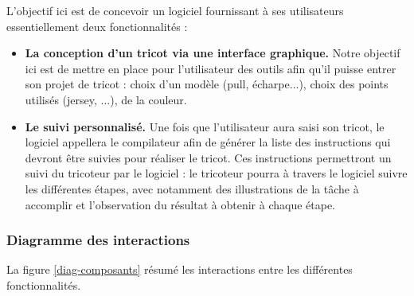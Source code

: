 \documentclass{article}
\begin{document}
L'objectif ici est de concevoir un logiciel fournissant à ses utilisateurs essentiellement deux fonctionnalités :
\begin{itemize}
  \item \textbf{La conception d'un tricot via une interface graphique.} Notre objectif ici est de mettre en place pour l'utilisateur des
  outils afin qu'il puisse entrer son projet de tricot : choix d'un modèle (pull, écharpe...), choix des points utilisés
  (jersey, ...), de la couleur.
  \item \textbf{Le suivi personnalisé.} Une fois que l'utilisateur aura saisi son tricot, le logiciel appellera le compilateur afin de générer
la liste des instructions qui devront être suivies pour réaliser le tricot. Ces instructions permettront un suivi du tricoteur par le
logiciel : le tricoteur pourra à travers le logiciel suivre les différentes étapes, avec notamment des illustrations de la tâche à
accomplir et l'observation du résultat à obtenir à chaque étape.
\end{itemize}

\subsubsection{Diagramme des interactions}

    La figure \ref{diag-composants} résumé les interactions entre les différentes fonctionnalités.
\end{document}
